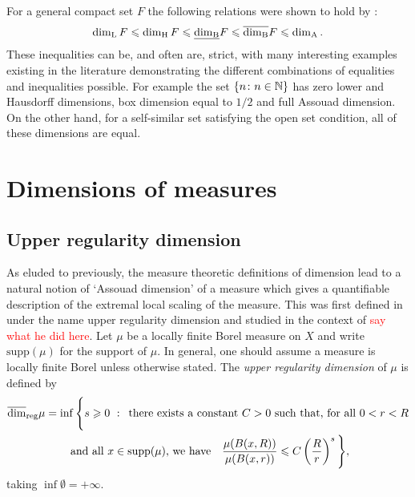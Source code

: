 For a general compact set $F$ the following relations were shown to hold by \cite{fraser, larman1, larman2}:
\[
\dim_{\textup{L}} F \leqslant \dim_{\text{H}} F \leqslant \underline{\dim_{\textup{B}}} F \leqslant \overline{\dim_{\textup{B}}} F \leqslant \dim_{\textup{A}}.
\]
These inequalities can be, and often are, strict, with many interesting examples existing in the literature demonstrating the different combinations of equalities and inequalities possible. For example the set $\left\{\/n \colon n \in \mathbb{N} \right\}$ has zero lower and Hausdorff dimensions, box dimension equal to $1/2$ and full Assouad dimension. On the other hand, for a self-similar set satisfying the open set condition, all of these dimensions are equal. 







\section{Dimensions of measures}
\label{sec:intro-measures}

\subsection{Upper regularity dimension}
\label{sec:intro-upper-reg}

As eluded to previously, the measure theoretic definitions of dimension lead to a natural notion of `Assouad dimension' of a measure which gives a quantifiable description of the extremal local scaling of the measure. This was first defined in \cite{anti1,anti2} under the name upper regularity dimension and studied in the context of \textcolor{red}{say what he did here}. Let $\mu$ be a locally finite Borel measure on $X$ and write $\text{supp}(\mu)$ for the support of $\mu$. In general, one should assume a measure is locally finite Borel unless otherwise stated. The \textit{upper regularity dimension} of $\mu$ is defined by 
\begin{multline*} 
\urdim \mu = \inf \Bigg\{ s \geq 0 \, \,  : \,  \text{ there exists a  constant }C  > 0\text{  such that, for all  $0< r< R $} \\ \text{  and all $x \in \text{supp} (\mu)$, we have }  \ \  \frac{\mu(B(x,R))}{\mu(B(x,r))} \leq C\left(\frac{R}{r}\right)^{s} \Bigg\},
\end{multline*}
taking $\inf \emptyset = + \infty$. 

